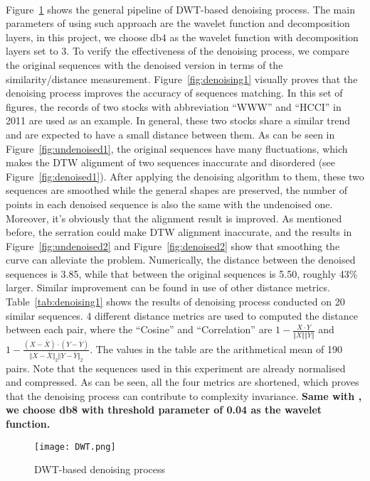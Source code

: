 \\Figure~\ref{fig:dwt1} shows the general pipeline of DWT-based denoising process. The main parameters of using such approach are the wavelet function and decomposition layers, in this project, we choose db4 as the wavelet function with decomposition layers set to 3. To verify the effectiveness of the denoising process, we compare the original sequences with the denoised version in terms of the similarity/distance measurement. Figure~\ref{fig:denoising1} visually proves that the denoising process improves the accuracy of sequences matching. In this set of figures, the records of two stocks with abbreviation ``WWW'' and ``HCCI'' in 2011 are used as an example. In general, these two stocks share a similar trend and are expected to have a small distance between them. As can be seen in Figure~\ref{fig:undenoised1}, the original sequences have many fluctuations, which makes the DTW alignment of two sequences inaccurate and disordered (see Figure~\ref{fig:denoised1}). After applying the denoising algorithm to them, these two sequences are smoothed while the general shapes are preserved, the number of points in each denoised sequence is also the same with the undenoised one. Moreover, it's obviously that the alignment result is improved. As mentioned before, the serration could make DTW alignment inaccurate, and the results in Figure~\ref{fig:undenoised2} and Figure~\ref{fig:denoised2} show that smoothing the curve can alleviate the problem. Numerically, the distance between the denoised sequences is 3.85, while that between the original sequences is 5.50, roughly 43\% larger. Similar improvement can be found in use of other distance metrics. Table~\ref{tab:denoising1} shows the results of denoising process conducted on 20 similar sequences. 4 different distance metrics are used to computed the distance between each pair, where the ``Cosine'' and ``Correlation'' are $1-\frac{X \cdot Y}{\Vert X \Vert \Vert Y \Vert}$ and $1-\frac{(X-\bar{X}) \cdot (Y-\bar{Y}) }{\Vert X-\bar{X} \Vert_2 \Vert Y-\bar{Y} \Vert_2}$. The values in the table are the arithmetical mean of 190 pairs. Note that the sequences used in this experiment are already normalised and compressed. As can be seen, all the four metrics are shortened, which proves that the denoising process can contribute to complexity invariance. \textbf{Same with \cite{wu2021hybrid}, we choose db8 with threshold parameter of 0.04 as the wavelet function.}
\begin{figure}[!htbp]
    \centering
    \texttt{[image: DWT.png]}
    \caption{DWT-based denoising process}
    \label{fig:dwt1}
\end{figure} 

